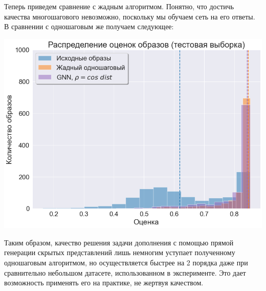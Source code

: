 \documentclass[a4paper,14pt]{extarticle}
\begin{document}
				Теперь приведем сравнение с жадным алгоритмом. Понятно, что достичь качества многошагового невозможно, поскольку мы обучаем сеть на его ответы. В сравнении с одношаговым же получаем следующее:
				
				\begin{center}
					\includegraphics[scale = 0.6]{../figures/GNN_at_least_5_subset1000_test_comparison.png}
				\end{center}
									
				Таким образом, качество решения задачи дополнения с помощью прямой генерации скрытых представлений лишь немногим уступает полученному одношаговым алгоритмом, но осуществляется быстрее на 2 порядка даже при сравнительно небольшом датасете, использованном в эксперименте. Это дает возможность применять его на практике, не жертвуя качеством.
				
\end{document}
